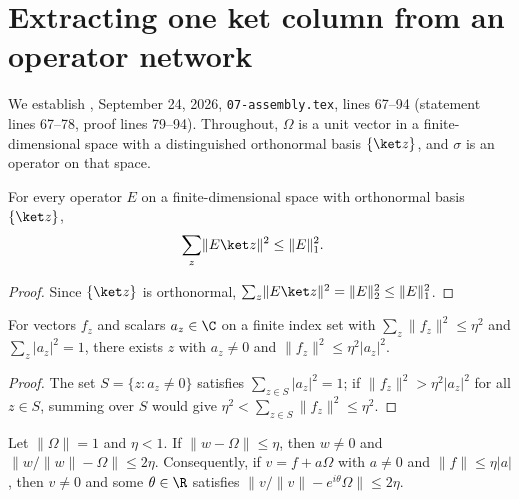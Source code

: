 \section{Extracting one ket column from an operator network}
\label{sec:peps_ket_column}
We establish \cite[Lemma~8.1]{OpenAI2026PolynomialPEPS},
September 24, 2026, \texttt{07-assembly.tex}, lines 67--94 (statement
lines 67--78, proof lines 79--94). Throughout, $\Omega$ is a unit vector in a
finite-dimensional space with a distinguished orthonormal basis
$\{\ket z\}$, and $\sigma$ is an operator on that space.

\begin{lemma}
    \label{thm:peps_ket_column_hilbert_schmidt}
    \leanok
    For every operator $E$ on a finite-dimensional space with orthonormal
    basis $\{\ket z\}$,
    \begin{align}
        \sum_z \lVert E\ket z\rVert^2 & \le \lVert E\rVert_1^2 .
    \end{align}
\end{lemma}

\begin{proof}\leanok
    Since $\{\ket z\}$ is orthonormal, $\sum_z\lVert E\ket z\rVert^2=\lVert E\rVert_2^2\le\lVert E\rVert_1^2$.
\end{proof}

\begin{lemma}
    \label{thm:peps_ket_column_selection}
    \leanok
    For vectors $f_z$ and scalars $a_z\in\C$ on a finite index set with
    $\sum_z\lVert f_z\rVert^2\le\eta^2$ and $\sum_z|a_z|^2=1$, there exists
    $z$ with $a_z\ne0$ and $\lVert f_z\rVert^2\le\eta^2|a_z|^2$.
\end{lemma}

\begin{proof}\leanok
    The set $S=\{z:a_z\ne0\}$ satisfies $\sum_{z\in S}|a_z|^2=1$; if $\lVert f_z\rVert^2>\eta^2|a_z|^2$ for all $z\in S$, summing over $S$ would give $\eta^2<\sum_{z\in S}\lVert f_z\rVert^2\le\eta^2$.
\end{proof}

\begin{lemma}
    \label{thm:peps_ket_column_normalization}
    \leanok
    Let $\lVert\Omega\rVert=1$ and $\eta<1$. If $\lVert w-\Omega\rVert\le\eta$,
    then $w\ne0$ and $\lVert w/\lVert w\rVert-\Omega\rVert\le2\eta$.
    Consequently, if $v=f+a\Omega$ with $a\ne0$ and
    $\lVert f\rVert\le\eta|a|$, then $v\ne0$ and some $\theta\in\R$ satisfies
    $\lVert v/\lVert v\rVert-e^{i\theta}\Omega\rVert\le2\eta$.
\end{lemma}

